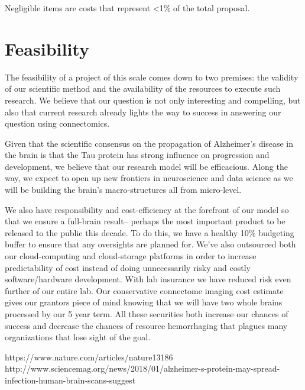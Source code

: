 \documentclass[11pt]{article}
\begin{document}
Negligible items are costs that represent \textless1\% of the total proposal. 

\section{Feasibility} 

The feasibility of a project of this scale comes down to two premises: the validity of our scientific method and the availability of the resources to execute such research. We believe that our question is not only interesting and compelling, but also that current research already lights the way to success in answering our question using connectomics. 

Given that the scientific consensus on the propagation of Alzheimer’s disease in the brain is that the Tau protein has strong influence on progression and development, we believe that our research model will be efficacious. Along the way, we expect to open up new frontiers in neuroscience and data science as we will be building the brain’s macro-structures all from micro-level. 

We also have responsibility and cost-efficiency at the forefront of our model so that we ensure a full-brain result-- perhaps the most important product to be released to the public this decade. To do this, we have a healthy 10\% budgeting buffer to ensure that any oversights are planned for. We’ve also outsourced both our cloud-computing and cloud-storage platforms in order to increase predictability of cost instead of doing unnecessarily risky and costly software/hardware development. With lab insurance we have reduced risk even further of our entire lab. Our conservative connectome imaging cost estimate gives our grantors piece of mind knowing that we will have two whole brains processed by our 5 year term. All these securities both increase our chances of success and decrease the chances of resource hemorrhaging that plagues many organizations that lose sight of the goal.

\begin{thebibliography}{2}

https://www.nature.com/articles/nature13186
http://www.sciencemag.org/news/2018/01/alzheimer-s-protein-may-spread-infection-human-brain-scans-suggest

\end{thebibliography}
\end{document}
